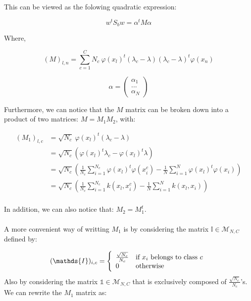 This can be viewed as the folowing quadratic expression:

\begin{equation*}
w^tS_bw = \alpha^tM\alpha
\end{equation*}

Where,

\begin{equation*}
(M)_{l,n} = \sum_{c=1}^C N_c ~\varphi(x_l)^t (\lambda_c - \lambda)(\lambda_c -\lambda)^t
\varphi(x_n)
\end{equation*}

\begin{equation*}
\alpha = \left( \begin{array}{c}
                                \alpha_1 \\
                                ... \\
                                \alpha_N
                  \end{array}  \right) 
\end{equation*}

Furthermore, we can notice that the $M$ matrix can be broken down into a product of two matrices: $M = M_1M_2$, with:

\begin{align*}
(M_1)_{l, c} &= \sqrt{N_c}~\varphi(x_l)^t(\lambda_c - \lambda)\\
             &= \sqrt{N_c}\left(\varphi(x_l)^t\lambda_c -\varphi(x_l)^t\lambda\right) \\
             &= \sqrt{N_c}\left(\frac{1}{N_c} \sum_{i=1}^{N_c} \varphi(x_l)^t\varphi(x_i^c) -
                 \frac{1}{N}\sum_{i=1}^N\varphi(x_l)^t\varphi(x_i)\right) \\
             &= \sqrt{N_c}\left(\frac{1}{N_c} \sum_{i = 1}^{N_c} k(x_l, x_i^c) -
                \frac{1}{N}\sum_{i=1}^N k(x_l, x_i)\right) \\
\end{align*}

In addition, we can also notice that: $M_2 = M_1^t$.

\paragraph{}
A more convenient way of writting $M_1$ is by considering the matrix $\mathds{I} \in
\mathcal{M}_{N,C}$ defined by:

$$ (\mathds{I})_{i, c} = \left\{ \begin{array}{ll}
                                  \frac{\sqrt{N_c}}{N_c} & \textnormal{if $x_i$ belongs to class $c$} \\
                                  0 & \textnormal{otherwise}
                               \end{array}
                        \right.$$
Also by considering the matrix $\mathds{1} \in \mathcal{M}_{N,C}$ that is exclusively composed of
$\frac{\sqrt{N_c}}{N_c}$'s.
We can rewrite the $M_1$ matrix as:

